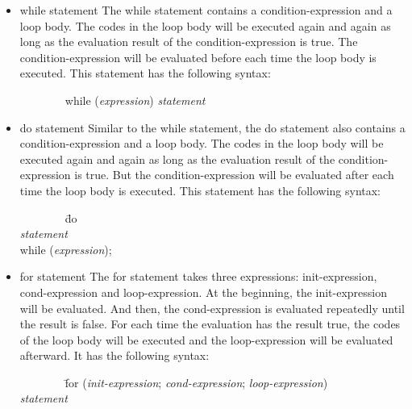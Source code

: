 \documentclass[12pt,psfig,a4]{article}
\begin{document}
\begin{itemize}
\item while statement
The while statement contains a condition-expression and a loop body. The codes in the loop body will be executed again and again as long as the evaluation result of the condition-expression is true. The condition-expression will be evaluated before each time the loop body is executed. This statement has the following syntax:

\begin{code}
\begin{tabbing}
~~~~~~~~while (\textsl{expression}) \textsl{statement}
\end{tabbing}
\end{code}

\item do statement
Similar to the while statement, the do statement also contains a condition-expression and a loop body. The codes in the loop body will be executed again and again as long as the evaluation result of the condition-expression is true. But the condition-expression will be evaluated after each time the loop body is executed. This statement has the following syntax:

\begin{code}
\begin{tabbing}
~~~~~~~~\= do \= \\
\> \> \textsl{statement} \\
\> while (\textsl{expression});
\end{tabbing}
\end{code}

\item for statement
The for statement takes three expressions: init-expression, cond-expression and loop-expression. At the beginning, the init-expression will be evaluated. And then, the cond-expression is evaluated repeatedly until the result is false. For each time the evaluation has the result true, the codes of the loop body will be executed and the loop-expression will be evaluated afterward. It has the following syntax:

\begin{code}
\begin{tabbing}
~~~~~~~~\= for (\= \textsl{init-expression}; \textsl{cond-expression}; \textsl{loop-expression}) \\
\> \> \textsl{statement}
\end{tabbing}
\end{code}


\end{itemize}
\end{document}
